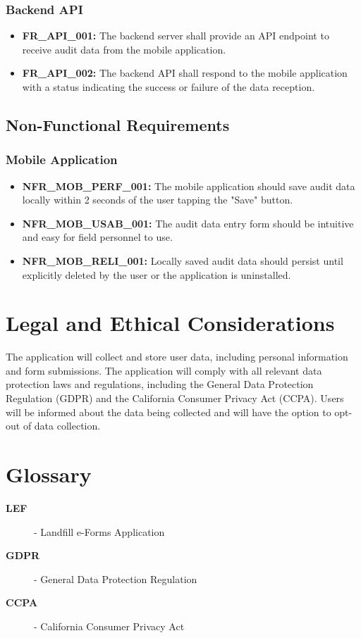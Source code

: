 \documentclass[12pt]{article}
\begin{document}
\subsubsection{Backend API}

\begin{itemize}
    \item \textbf{FR\_API\_001:} The backend server shall provide an API endpoint to receive audit data from the mobile application.
    \item \textbf{FR\_API\_002:} The backend API shall respond to the mobile application with a status indicating the success or failure of the data reception.
\end{itemize}

\subsection{Non-Functional Requirements}

\subsubsection{Mobile Application}

\begin{itemize}
    \item \textbf{NFR\_MOB\_PERF\_001:} The mobile application should save audit data locally within 2 seconds of the user tapping the "Save" button.
    \item \textbf{NFR\_MOB\_USAB\_001:} The audit data entry form should be intuitive and easy for field personnel to use.
    \item \textbf{NFR\_MOB\_RELI\_001:} Locally saved audit data should persist until explicitly deleted by the user or the application is uninstalled.
\end{itemize}

\newpage

\section{Legal and Ethical Considerations}
The application will collect and store user data, including personal information and form submissions. The application will comply with all relevant data protection laws and regulations, including the General Data Protection Regulation (GDPR) and the California Consumer Privacy Act (CCPA). Users will be informed about the data being collected and will have the option to opt-out of data collection.
\newpage

\section*{Glossary}
\begin{description}
    \item[\textbf{LEF}] - Landfill e-Forms Application
    \item[\textbf{GDPR}] - General Data Protection Regulation
    \item[\textbf{CCPA}] - California Consumer Privacy Act
\end{description}
\end{document}
